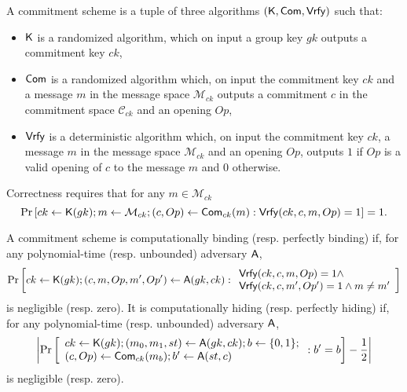 \begin{definition} A commitment scheme is a tuple of three algorithms 
	$(\mathsf{K},\mathsf{Com},\mathsf{Vrfy})$ such that:
	\begin{itemize} 
		\item  $\mathsf{K}$ is a randomized algorithm, which on input a group key $gk$ outputs a commitment key $ck$,
		\item $\mathsf{Com}$ is a randomized algorithm which, on input the commitment key $ck$ and a message 
		$m$ in the message space $\mathcal{M}_{ck}$ outputs a commitment $c$ in the commitment space $\mathcal{C}_{ck}$ and an opening $Op$, 
	\item $\mathsf{Vrfy}$ is a deterministic algorithm which, on input the commitment key $ck$,  a message 
	$m$ in the message space $\mathcal{M}_{ck}$ and an opening $Op$, outputs $1$ if $Op$ is a valid opening of $c$ to the message $m$ and $0$ otherwise. 
	\end{itemize}
\end{definition}

Correctness requires that for any $m \in \mathcal{M}_{ck}$
$$\Pr\left[ck \gets \mathsf{K}(gk); m \gets \mathcal{M}_{ck}; 
(c, Op) \gets \mathsf{Com}_{ck}(m): \mathsf{Vrfy}(ck,c,m,Op)=1 \right]=1.$$


\begin{definition}  A commitment scheme is computationally binding (resp. perfectly binding) if, for any polynomial-time (resp. unbounded)  adversary $\mathsf{A}$, 
	$$\Pr\left[ck \gets \mathsf{K}(gk); (c,m,Op,m',Op') \gets \mathsf{A}(gk,ck): \begin{array}{l}\mathsf{Vrfy}(ck,c,m,Op)=1 \wedge\\ \mathsf{Vrfy}(ck,c,m',Op')=1 \wedge m\neq m'\end{array}\right] $$
	is negligible (resp. zero).  It is computationally hiding (resp. perfectly hiding)  if, for any polynomial-time (resp. unbounded) adversary $\mathsf{A}$,
	$$\left|\Pr\left[ \begin{array}{l} ck \gets \mathsf{K}(gk); (m_0,m_1,st) \gets \mathsf{A}(gk,ck); b \gets \{0,1\};\\ (c,Op) \gets \mathsf{Com}_{ck}(m_b); b' \gets \mathsf{A}(st,c)
                      \end{array} : b'=b\right] -\dfrac{1}{2} \right|$$
	is negligible (resp. zero).
\end{definition}

